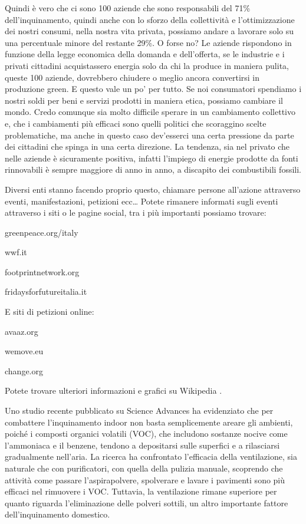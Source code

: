 \documentclass[12pt]{book} %
\begin{document}
Quindi è vero che ci sono 100 aziende che sono responsabili del 71\% dell'inquinamento, quindi
anche con lo sforzo della collettività e l'ottimizzazione dei nostri consumi, nella nostra vita
privata, possiamo andare a lavorare solo su una percentuale minore del restante 29\%. O forse no? Le aziende rispondono
in funzione della legge economica della domanda e dell'offerta, se le industrie e i privati
cittadini acquistassero energia solo da chi la produce in maniera pulita, queste 100 aziende, dovrebbero chiudere o
meglio ancora convertirsi in produzione green. E questo vale un po' per tutto. Se noi consumatori
spendiamo i nostri soldi per beni e servizi prodotti in maniera etica, possiamo cambiare il mondo.
Credo comunque sia molto difficile sperare in un cambiamento collettivo e, che i cambiamenti più efficaci sono quelli politici che scoraggino scelte problematiche, ma anche in questo caso dev'esserci una certa pressione da parte dei cittadini che spinga in una certa direzione.
La tendenza, sia nel privato che nelle aziende è sicuramente positiva, infatti l'impiego di energie prodotte da fonti
rinnovabili è sempre maggiore di anno in anno, a discapito dei combustibili fossili.

Diversi enti stanno facendo proprio questo, chiamare persone all'azione attraverso eventi,
manifestazioni, petizioni ecc… Potete rimanere informati sugli eventi attraverso i siti o le pagine social, tra i più
importanti possiamo trovare:

greenpeace.org/italy

wwf.it

footprintnetwork.org

fridaysforfutureitalia.it 


\bigskip

E siti di petizioni online:

avaaz.org

wemove.eu

change.org


\bigskip

Potete trovare ulteriori informazioni e grafici su
Wikipedia
.


\begin{mdframed}[linewidth=1pt]
Uno studio recente pubblicato su Science Advances ha evidenziato che per combattere l’inquinamento indoor non basta semplicemente areare gli ambienti, poiché i composti organici volatili (VOC), che includono sostanze nocive come l’ammoniaca e il benzene, tendono a depositarsi sulle superfici e a rilasciarsi gradualmente nell’aria. La ricerca ha confrontato l’efficacia della ventilazione, sia naturale che con purificatori, con quella della pulizia manuale, scoprendo che attività come passare l’aspirapolvere, spolverare e lavare i pavimenti sono più efficaci nel rimuovere i VOC. Tuttavia, la ventilazione rimane superiore per quanto riguarda l’eliminazione delle polveri sottili, un altro importante fattore dell’inquinamento domestico.
\end{mdframed}
\end{document}
